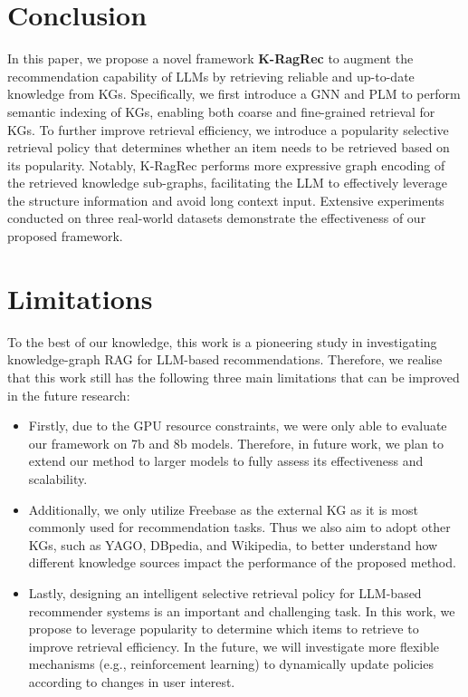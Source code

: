 \section{Conclusion}
In this paper, we propose a novel framework \textbf{K-RagRec} to augment the recommendation capability of LLMs by retrieving reliable and up-to-date knowledge from KGs. Specifically, 
we first introduce a GNN and PLM to perform semantic indexing of KGs, enabling both coarse and fine-grained retrieval for KGs. To further improve retrieval efficiency, we introduce a popularity selective retrieval policy that determines whether an item needs to be retrieved based on its popularity. 
Notably, K-RagRec performs more expressive graph encoding of the retrieved knowledge sub-graphs, facilitating the LLM to effectively leverage the structure information and avoid long context input. Extensive experiments conducted on three real-world datasets demonstrate the effectiveness of our proposed framework.







\section{Limitations}
To the best of our knowledge, this work is a pioneering study in investigating knowledge-graph RAG for LLM-based recommendations.  Therefore, we realise that this work still has the following three main limitations that can be improved in the future research:
\vspace{-0.1in}
 \begin{itemize} [leftmargin=*] 
\setlength{\itemsep}{0pt}
\setlength{\parsep}{0pt}
\setlength{\parskip}{0pt}
\item Firstly, due to the GPU resource constraints, we were only able to evaluate our framework on 7b and 8b models. Therefore, in future work, we plan to extend our method to larger models to fully assess its effectiveness and scalability.
\item Additionally, we only utilize Freebase as the external KG as it is most commonly used for recommendation tasks. 
Thus we also aim to adopt other KGs, such as YAGO, DBpedia, and Wikipedia, to better understand how different knowledge sources impact the performance of the proposed method.
\item Lastly, designing an intelligent selective retrieval policy for LLM-based recommender systems is an important and challenging task.
In this work, we propose to leverage popularity to
determine which items to retrieve to improve retrieval efficiency.
In the future, we will investigate more flexible mechanisms (e.g., reinforcement learning) to dynamically update policies according to changes in user interest. 
\end{itemize}

